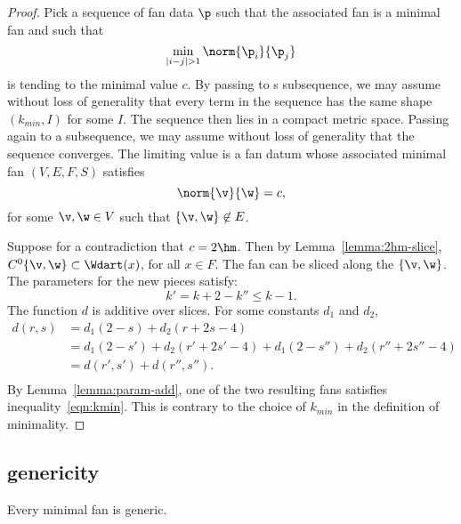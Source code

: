 \begin{proof} Pick a sequence of fan data $\p$ such that the associated
fan is a minimal fan and such that 
\begin{displaymath}
\min_{|i-j|>1} \norm{\p_i}{\p_j}
\end{displaymath}
is tending to the minimal value $c$.  By passing to s subsequence, we
may assume without loss of generality that every term in the sequence
has the same shape $(k_{min},I)$ for some $I$.  The sequence then lies
in a compact metric space.  Passing again to a subsequence, we may
assume without loss of generality that the sequence converges.  The
limiting value is a fan datum whose associated minimal fan $(V,E,F,S)$
satisfies
\begin{displaymath}
\norm{\v}{\w}=c,
\end{displaymath}
for some $\v,\w\in V$ such that $\{\v,\w\}\not\in E$.

Suppose for a contradiction that $c=2\hm$.  Then by
Lemma~\ref{lemma:2hm-slice}, $C^0\{\v,\w\}\subset \Wdart(x)$, for all
$x\in F$.  The fan can be sliced along the $\{\v,\w\}$.  The
parameters for the new pieces satisfy:
\begin{displaymath}
k' = k+2 - k'' \le k-1.
\end{displaymath}
The function $d$ is additive over slices.  For some constants $d_1$
and $d_2$,
\begin{equation}\label{eqn:drs}
\begin{array}{lll}
d(r,s) &= d_1 (2 - s) + d_2 (r + 2 s-4) \\
&= d_1 (2-s') + d_2 (r'+2 s'-4) + d_1 (2-s'') + d_2 (r''+2s''-4)\\
&= d(r',s') + d(r'',s''). \\
\end{array}
\end{equation}
By Lemma~\ref{lemma:param-add}, one of the two resulting fans
satisfies inequality~\ref{eqn:kmin}.  This is contrary to the choice
of $k_{min}$ in the definition of minimality.
\end{proof}





\subsection{genericity}

\begin{lemma}[]\label{lemma:circular-nonmin}
Every minimal fan is generic.
\end{lemma}

